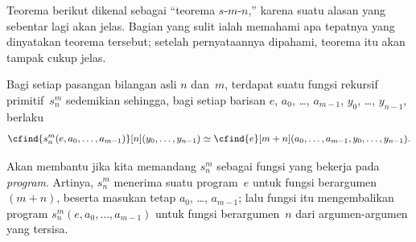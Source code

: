 \documentclass[../../../include/open-logic-section]{subfiles}
\begin{document}

\begin{explain}
Teorema berikut dikenal sebagai ``teorema $s$-$m$-$n$,'' karena suatu alasan
yang sebentar lagi akan jelas. Bagian yang sulit ialah memahami apa tepatnya
yang dinyatakan teorema tersebut; setelah pernyataannya dipahami, teorema itu
akan tampak cukup jelas.
\end{explain}

\begin{thm}
  Bagi setiap pasangan bilangan asli $n$ dan~$m$, terdapat suatu fungsi
  rekursif primitif~$s^m_n$ sedemikian sehingga, bagi setiap barisan
  $e$, $a_0$, \dots, $a_{m-1}$, $y_0$, \dots, $y_{n-1}$, berlaku
  \[
  \cfind{s^m_n(e, a_0, \dots, a_{m-1})}[n](y_0, \dots, y_{n-1}) \simeq
  \cfind{e}[m+n](a_0, \dots, a_{m-1}, y_0, \dots, y_{n-1}).
  \]
\end{thm}

\begin{explain}
Akan membantu jika kita memandang $s^m_n$ sebagai fungsi yang bekerja pada
\emph{program}. Artinya, $s^m_n$ menerima suatu program~$e$ untuk fungsi
berargumen $(m+n)$, beserta masukan tetap $a_0$, \dots, $a_{m-1}$; lalu fungsi
itu mengembalikan program $s^m_n(e, a_0, \dots, a_{m-1})$ untuk fungsi
berargumen~$n$ dari argumen-argumen yang tersisa. 
\end{explain}
\end{document}
